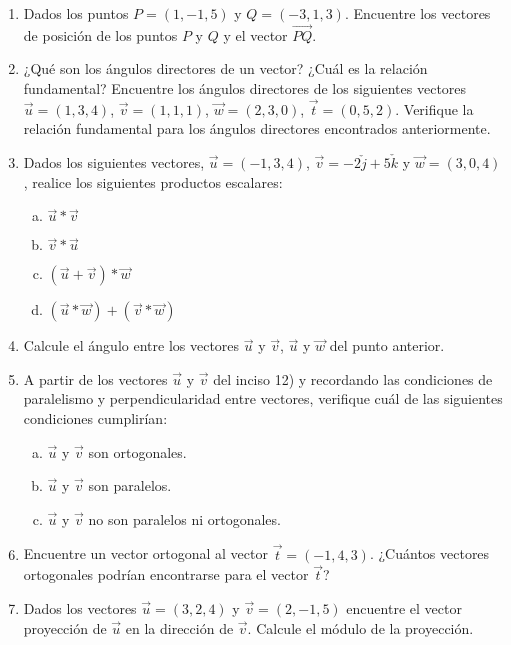 \documentclass[11pt,a4paper]{article}
\begin{document}
\begin{enumerate}
\item Dados los puntos $P = (1, -1, 5)$ y $Q = (-3, 1, 3)$. Encuentre los vectores de posici\'on de los puntos $P$ y $Q$ y el vector $\vec{PQ}$.

\item ¿Qu\'e son los \'angulos directores de un vector? ¿Cu\'al es la relaci\'on fundamental? Encuentre los \'angulos directores de los siguientes vectores $\vec{u} = (1, 3, 4)$, $\vec{v} = (1, 1, 1)$, $\vec{w} = (2, 3, 0)$, $\vec{t} = (0, 5, 2)$. Verifique la relaci\'on fundamental para los \'angulos directores encontrados anteriormente.

\item Dados los siguientes vectores, $\vec{u} = (-1, 3, 4)$, $\vec{v} = -2 \check{j} + 5 \check{k}$ y $\vec{w} = (3, 0, 4)$, realice los siguientes productos escalares:

\begin{enumerate}[a)]
\item $\vec{u} * \vec{v}$
\item $\vec{v} * \vec{u}$
\item $(\vec{u} + \vec{v}) * \vec{w}$
\item $(\vec{u} * \vec{w}) + (\vec{v} * \vec{w})$
\end{enumerate}

\item Calcule el \'angulo entre los vectores $\vec{u}$ y $\vec{v}$, $\vec{u}$ y $\vec{w}$ del punto anterior.

\item A partir de los vectores $\vec{u}$ y $\vec{v}$ del inciso 12) y recordando las condiciones de paralelismo y perpendicularidad entre vectores, verifique cu\'al de las siguientes condiciones cumplir\'ian:

\begin{enumerate}[a)]
\item $\vec{u}$ y $\vec{v}$ son ortogonales.
\item $\vec{u}$ y $\vec{v}$ son paralelos.
\item $\vec{u}$ y $\vec{v}$ no son paralelos ni ortogonales.
\end{enumerate}

\item Encuentre un vector ortogonal al vector $\vec{t} = (-1, 4, 3)$. ¿Cu\'antos vectores ortogonales podr\'ian encontrarse para el vector $\vec{t}$?

\item Dados los vectores $\vec{u} = (3, 2, 4)$ y $\vec{v} = (2, -1, 5)$ encuentre el vector proyecci\'on de $\vec{u}$ en la direcci\'on de $\vec{v}$. Calcule el m\'odulo de la proyecci\'on.


\end{enumerate}
\end{document}
